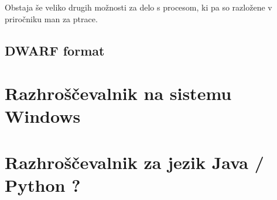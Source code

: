 \documentclass[a4paper,notitlepage]{article}
\begin{document}
Obstaja še veliko drugih možnosti za delo s procesom, ki pa so razložene v priročniku man za ptrace\cite{ptrace-man-page}.

\subsection{DWARF format}

\section{Razhroščevalnik na sistemu Windows}


\section{Razhroščevalnik za jezik Java / Python ?}

\nocite{*} %


\end{document}
